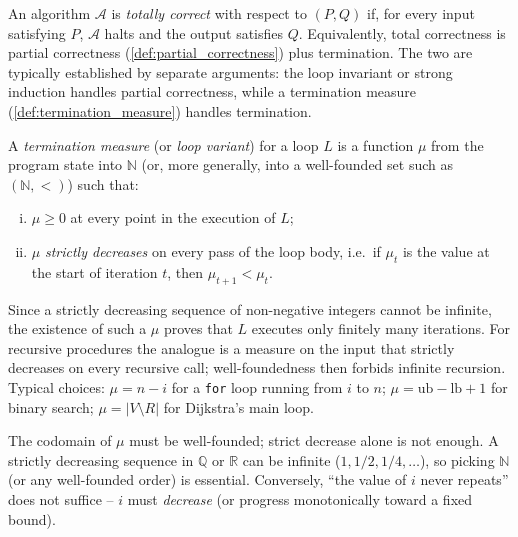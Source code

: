 \begin{definition}
\label{def:total_correctness}
An algorithm $\mathcal{A}$ is \emph{totally correct} with respect to $(P, Q)$ if, for every input satisfying $P$, $\mathcal{A}$ halts and the output satisfies $Q$. Equivalently, total correctness is partial correctness (\cref{def:partial_correctness}) plus termination. The two are typically established by separate arguments: the loop invariant or strong induction handles partial correctness, while a termination measure (\cref{def:termination_measure}) handles termination.
\end{definition}

\begin{definition}
\label{def:termination_measure}
A \emph{termination measure} (or \emph{loop variant}) for a loop $L$ is a function $\mu$ from the program state into $\mathbb{N}$ (or, more generally, into a well-founded set such as $(\mathbb{N}, <)$) such that:
\begin{enumerate}[(i)]
  \item $\mu \ge 0$ at every point in the execution of $L$;
  \item $\mu$ \emph{strictly decreases} on every pass of the loop body, i.e.\ if $\mu_t$ is the value at the start of iteration $t$, then $\mu_{t+1} < \mu_t$.
\end{enumerate}
Since a strictly decreasing sequence of non-negative integers cannot be infinite, the existence of such a $\mu$ proves that $L$ executes only finitely many iterations. For recursive procedures the analogue is a measure on the input that strictly decreases on every recursive call; well-foundedness then forbids infinite recursion. Typical choices: $\mu = n - i$ for a \texttt{for} loop running from $i$ to $n$; $\mu = \mathrm{ub} - \mathrm{lb} + 1$ for binary search; $\mu = |V \setminus R|$ for Dijkstra's main loop.
\end{definition}

\begin{remark}
The codomain of $\mu$ must be well-founded; strict decrease alone is not enough. A strictly decreasing sequence in $\mathbb{Q}$ or $\mathbb{R}$ can be infinite ($1, 1/2, 1/4, \dots$), so picking $\mathbb{N}$ (or any well-founded order) is essential. Conversely, ``the value of $i$ never repeats'' does not suffice -- $i$ must \emph{decrease} (or progress monotonically toward a fixed bound).
\end{remark}

